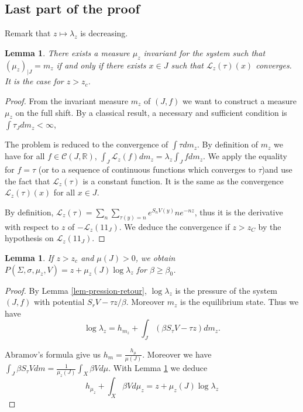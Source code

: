 \documentclass[11 pt]{article}
\newtheorem{lemma}[proposition]{Lemma}
\newcommand {\CL}{{\mathcal L}}
\newcommand{\BBone}{{1\!\!1}}
\theoremstyle{definition}
\begin{document}
\subsection{Last part of the proof}
Remark that $z\mapsto \lambda_z$ is decreasing.



\begin{lemma}\label{lem-mesure-mu}
There exists a measure $\mu_z$ invariant for the system such that $(\mu_z)_{|J}=m_z$ if and only  if there exists $x\in J$ such that $\mathcal L_z(\tau)(x)$ converges. It is the case for $z>z_c$.
\end{lemma}
\begin{proof}
From the invariant measure $m_z$ of $(J,f)$ we want to construct a measure $\mu_z$ on the full shift. By a classical result, a necessary and sufficient condition is $\int \tau_J dm_z<\infty$,

The problem is reduced to the convergence of $\int \tau dm_z$. By definition of $m_z$ we have for all $f\in \mathcal C(J,\mathbb R)$, $\int_J \CL_z(f)dm_z=\lambda_z\int_J f dm_z$. We apply the equality for $f=\tau$ (or to a sequence of continuous functions which converges to $\tau$)and use the fact that $\CL_z(\tau)$ is a constant function.
It is the same as the convergence  $\CL_z(\tau)(x)$ for all $x\in J$. 

By definition, $\mathcal L_z(\tau)=\sum_n\sum_{\tau(y)=n}e^{S_nV(y)}ne^{-nz}$, 
thus it is the derivative with respect to $z$ of $-\mathcal L_z(\BBone_J)$. We deduce the convergence if $z>z_C$ by the hypothesis on $\CL_{z}(\BBone_J)$.
\end{proof}


\begin{lemma} If $z>z_c$ and $\mu(J)>0$, we obtain
$P(\Sigma,\sigma, \mu_z, V)=z+\mu_z(J)\log\lambda_z$ for $\beta\geq \beta_0$.
\end{lemma}
\begin{proof}
By Lemma \ref{lem-pression-retour}, $\log \lambda_z$ is the pressure of the system $(J, f)$ with potential $S_rV-\tau z/\beta$. Moreover $m_z$ is the equilibrium state. Thus we have
$$\log\lambda_z=h_{m_z}+\int_J (\beta S_\tau V-\tau z)dm_z.$$

Abramov's formula give us $h_{m}=\frac{h_\mu}{\mu(J)}$. Moreover we have $\int_J \beta S_\tau Vdm=\frac{1}{\mu_z(J)} \int_X \beta Vd\mu$. With Lemma \ref{lem-mesure-mu} we deduce 
$$h_{\mu_z}+\int _X\beta V d\mu_z=z+\mu_z(J)\log \lambda_z$$
\end{proof}
\end{document}
